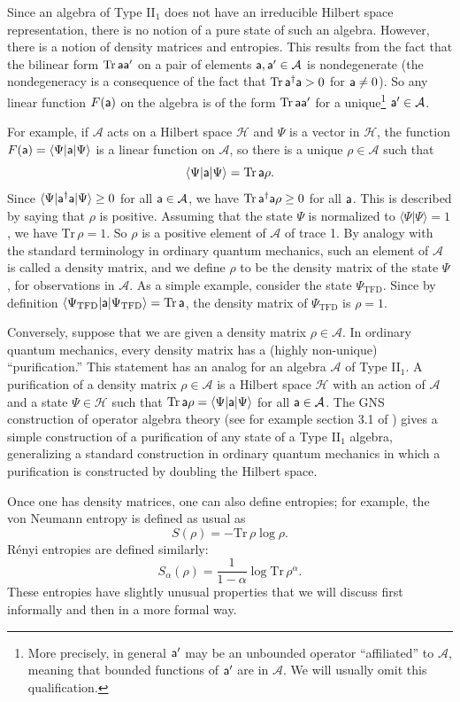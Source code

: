 \documentclass[11pt,a4paper]{article}
\def\a{{\sf a}}
\def\be{\begin{equation}}
\def\ee{\end{equation}}
\def\A{{\mathcal A}}
\def\H{{\mathcal H}}
\def\la{\langle}
\def\ra{\rangle}
\def\Tr{{\mathrm{Tr}}}
\def\TFD{{\mathrm{TFD}}}
\begin{document}
Since an algebra of Type II$_1$ does not have an irreducible Hilbert space 
representation, there is no notion of a pure state of such an algebra.   However, there is a notion of
density matrices and entropies.   This results from the fact that the bilinear form $\Tr\,\a\a'$ on a pair of elements $\a,\a'\in\A$ is nondegenerate (the nondegeneracy
is a consequence of the fact that $\Tr\,\a^\dagger\a>0$ for $\a\not=0$).    So any linear function $F(\a)$ on the algebra is of the form $\Tr\,\a\a'$ for a unique\footnote{More precisely, in general $\a'$ may be an unbounded operator 
 ``affiliated'' to $\A$, meaning that bounded functions of $\a'$ are in $\A$. We will usually omit this qualification.}  $\a'\in\A$.


For example, if $\A$ acts on a Hilbert space $\H$ and $\Psi$ is a vector in $\H$, the function $F(\a)=\la\Psi|\a|\Psi\ra$ is a linear function on $\A$, so there is
a unique $\rho\in\A$ such that
\be\label{dono} \la\Psi|\a|\Psi\ra =\Tr\,\a\rho. \ee   Since $\la\Psi|\a^\dagger\a|\Psi\ra\geq 0$ for all $\a\in\A$, we have $\Tr\,\a^\dagger\a\rho\geq 0$ for all $\a$.
This is described by saying that $\rho$ is positive.   Assuming that the state $\Psi$ is normalized to $\la\Psi|\Psi\ra=1$, we have $\Tr\,\rho=1$.
So $\rho$ is a positive element of $\A$ of trace 1.  
By analogy with the standard terminology in ordinary quantum mechanics, such an element of $\A$ is called a density matrix, and we
define $\rho$ to be the density matrix  of the state $\Psi$, for observations in $\A$.   As a simple example, consider the state $\Psi_\TFD$.   Since by
definition $\la\Psi_\TFD|\a|\Psi_\TFD\ra=\Tr\,\a$, the density matrix of $\Psi_\TFD$ is $\rho=1$.


Conversely, suppose that we are given a density matrix $\rho\in\A$.   In ordinary quantum mechanics, every density matrix has a (highly non-unique) ``purification.''
This statement has an analog for an algebra $\A$ of Type II$_1$.   A purification of a density matrix 
$\rho\in\A$ is a Hilbert space $\H$ with an action of $\A$ and a state $\Psi\in\H$ such that
$\Tr\,\a\rho=\la\Psi|\a|\Psi\ra$ for all $\a\in \A$.    The GNS construction of operator algebra theory 
 (see for example section 3.1 of \cite{Curved})
gives a simple construction of a purification of any state of a Type II$_1$ algebra,
generalizing a standard construction in ordinary quantum mechanics in which a purification is constructed by doubling the Hilbert space.

Once one has density matrices, one can also define entropies; for example, the von Neumann entropy is defined as usual as
\be\label{wono}S(\rho)=-\Tr\,\rho\log\rho.\ee
R\'{e}nyi entropies are defined similarly:
\be\label{renyi}S_\alpha(\rho)=\frac{1}{1-\alpha}\log \Tr\,\rho^\alpha.\ee  These entropies have slightly unusual properties that we will discuss first informally
and then in a more formal way.
\end{document}
